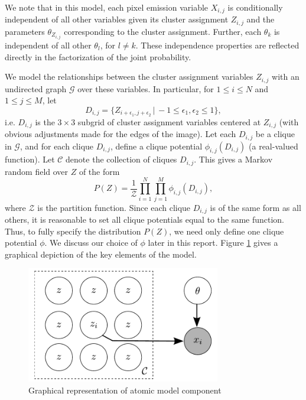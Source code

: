 \documentclass[12pt]{article}
\begin{document}
We note that in this model, each pixel emission variable $X_{i,j}$ is conditionally
independent of all other
variables given its cluster assignment $Z_{i,j}$ and the parameters $\theta_{Z_{i,j}}$
corresponding to the cluster assignment. Further, each $\theta_k$ is independent of all
other $\theta_l$, for $l \neq k$. These independence properties are reflected
directly in the factorization of the joint probability.

We model the relationships between the cluster assignment variables $Z_{i,j}$ with an undirected graph
$\mathcal{G}$ over these variables.
In particular, for $1 \leq i \leq N$ and $1 \leq j \leq M$, let
\[
D_{i,j} = \{Z_{i+\epsilon_1,j+\epsilon_2}\,|\,-1 \leq \epsilon_1, \epsilon_2 \leq 1\},
\]
i.e. $D_{i,j}$ is the $3\times 3$ subgrid of cluster assignment variables centered at $Z_{i,j}$
(with obvious adjustments made for the edges of the image). Let each $D_{i,j}$ be a clique in
$\mathcal{G}$, and for each clique $D_{i,j}$, define a clique potential $\phi_{i,j}(D_{i,j})$
(a real-valued function).
Let $\mathcal{C}$ denote the collection of cliques $D_{i,j}$.
This gives a Markov random field over $Z$ of the form
\[
P(Z) = \frac{1}{\mathcal{Z}}\prod_{i=1}^N\prod_{j=1}^M \phi_{i,j}(D_{i,j}),
\]
where $\mathcal{Z}$ is the partition function.
Since each clique $D_{i,j}$ is of the same form as all others,
it is reasonable to set all clique potentials equal to the same function.
Thus, to fully specify the distribution $P(Z)$, we need only define one clique potential $\phi$.
We discuss our choice of $\phi$ later in this report. Figure \ref{fig:graph} gives a graphical
depiction of the key elements of the model.

\begin{figure}
    \begin{center}
        \includegraphics[height=2in]{graph.pdf}
        \caption{Graphical representation of atomic model component}
        \label{fig:graph}
    \end{center}
\end{figure}
\end{document}
